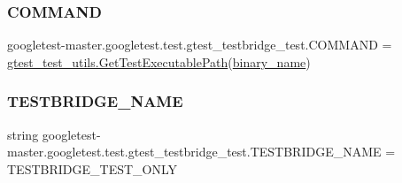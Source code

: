 \subsubsection{\texorpdfstring{COMMAND}{COMMAND}}
{\footnotesize\ttfamily googletest-\/master.\+googletest.\+test.\+gtest\+\_\+testbridge\+\_\+test.\+C\+O\+M\+M\+A\+ND = \mbox{\hyperlink{namespacegoogletest-master_1_1googletest_1_1test_1_1gtest__test__utils_a78bbc69ac699e750a6a29188caa643c4}{gtest\+\_\+test\+\_\+utils.\+Get\+Test\+Executable\+Path}}(\mbox{\hyperlink{namespacegoogletest-master_1_1googletest_1_1test_1_1gtest__testbridge__test_a61d45a2f7d0ff15c80eca60d04ea0272}{binary\+\_\+name}})}

\mbox{\label{namespacegoogletest-master_1_1googletest_1_1test_1_1gtest__testbridge__test_a5d62a403331d71892d7e0952513fe6ed}} 
\subsubsection{\texorpdfstring{TESTBRIDGE\_NAME}{TESTBRIDGE\_NAME}}
{\footnotesize\ttfamily string googletest-\/master.\+googletest.\+test.\+gtest\+\_\+testbridge\+\_\+test.\+T\+E\+S\+T\+B\+R\+I\+D\+G\+E\+\_\+\+N\+A\+ME = \textquotesingle{}T\+E\+S\+T\+B\+R\+I\+D\+G\+E\+\_\+\+T\+E\+S\+T\+\_\+\+O\+N\+LY\textquotesingle{}}

